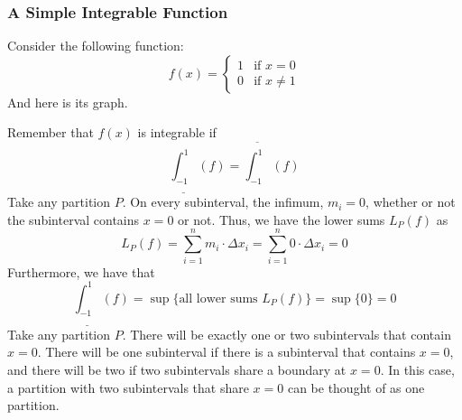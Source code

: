 \documentclass[11pt]{article}
\begin{document}
\subsubsection{A Simple Integrable Function}
Consider the following function:
$$
    f(x)=\begin{cases}1&\text{if $x=0$} \\ 0&\text{if $x\neq 1$}\end{cases}
$$
And here is its graph.
\begin{center}
\end{center}
Remember that $f(x)$ is integrable if
$$
    \underline{\int_{-1}^{1}}(f)=\overline{\int_{-1}^{1}}(f)
$$
Take any partition $P$. On every subinterval, the infimum, $m_i=0$, whether or not the subinterval contains $x=0$ or not. Thus, we have the lower sums $L_P(f)$ as
$$
    L_P(f)=\sum_{i=1}^n m_i\cdot \Delta x_i=\sum_{i=1}^n 0\cdot\Delta x_i=0
$$
Furthermore, we have that
$$
    \underline{\int_{-1}^{1}}(f)=\sup\{\text{all lower sums $L_P(f)$}\}=\sup\{0\}=0
$$
Take any partition $P$. There will be exactly one or two subintervals that contain $x=0$. There will be one subinterval if there is a subinterval that contains $x=0$, and there will be two if two subintervals share a boundary at $x=0$. In this case, a partition with two subintervals that share $x=0$ can be thought of as one partition.
\begin{center}
\end{center}
\end{document}
